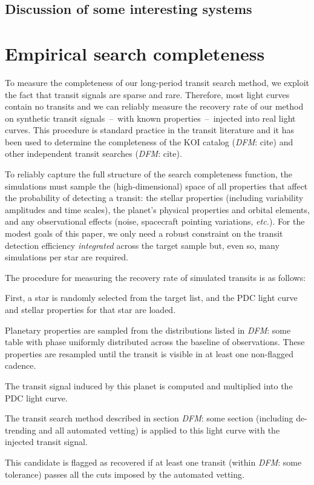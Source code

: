 \documentclass[manuscript, letterpaper]{aastex6}
\newcommand{\foreign}[1]{\emph{#1}}
\newcommand{\etc}{\foreign{etc.}}
\newcommand{\todo}[3]{{\color{#2}\emph{#1}: #3}}
\newcommand{\dfmtodo}[1]{\todo{DFM}{red}{#1}}
\begin{document}
\subsection{Discussion of some interesting systems}



\section{Empirical search completeness}

To measure the completeness of our long-period transit search method, we
exploit the fact that transit signals are sparse and rare.
Therefore, most light curves contain no transits and we can reliably measure
the recovery rate of our method on synthetic transit signals~--~with known
properties~--~injected into real light curves.
This procedure is standard practice in the transit literature and it has been
used to determine the completeness of the KOI catalog (\dfmtodo{cite}) and
other independent transit searches (\dfmtodo{cite}).

To reliably capture the full structure of the search completeness function,
the simulations must sample the (high-dimensional) space of all properties
that affect the probability of detecting a transit: the stellar properties
(including variability amplitudes and time scales), the planet's physical
properties and orbital elements, and any observational effects (noise,
spacecraft pointing variations, \etc).
For the modest goals of this paper, we only need a robust constraint on the
transit detection efficiency \emph{integrated} across the target sample but,
even so, many simulations per star are required.

The procedure for measuring the recovery rate of simulated transits is as
follows:
\begin{enumerate}
{\item First, a star is randomly selected from the target list, and the PDC
light curve and stellar properties for that star are loaded.}
{\item Planetary properties are sampled from the distributions listed in
\dfmtodo{some table} with phase uniformly distributed across the baseline of
observations. These properties are resampled until the transit is visible in
at least one non-flagged cadence.}
{\item The transit signal induced by this planet is computed and multiplied
into the PDC light curve.}
{\item The transit search method described in section \dfmtodo{some section}
(including de-trending and all automated vetting) is applied to this light
curve with the injected transit signal.}
{\item This candidate is flagged as recovered if at least one transit (within
\dfmtodo{some tolerance}) passes all the cuts imposed by the automated
vetting.}
\end{enumerate}
\end{document}
